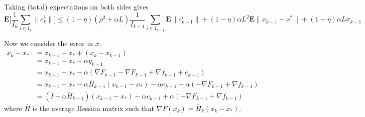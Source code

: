 \documentclass{article}
\begin{document}
 Taking (total) expectations on both sides gives
 \[
\mathbf{E}[ \frac{1}{I_k} \sum_{i\in I_k}{\|e_k^i\|] } \leq (1-\eta)(\rho^2+\alpha  L) \frac{1}{I_{k-1}}\sum_{i\in I_{k-1}}\mathbf{E}\|e_{k-1}^i\| + (1-\eta) \alpha  L^2 \mathbf{E}\|  x_{k-1}  -x^*  \|  + (1-\eta) \alpha  L\sigma_{k-1}
 \]
 
 

\bigskip

\bigskip

\noindent 

Now we consider the error in $x$.
 \begin{align*}
  x_k-x_\ast &= x_{k-1}-x_\ast + (x_k-x_{k-1})\\
  &=x_{k-1}-x_\ast -\alpha y_{k-1}\\
  &=x_{k-1}-x_\ast -\alpha (\nabla F_{k-1}-\nabla F_{k-1}+\nabla f_{k-1} + e_{k-1})\\
  &=x_{k-1}-x_\ast -\alpha\bar H_{k-1}(x_{k-1}-x_\ast) -\alpha e_{k-1} +\alpha (-\nabla F_{k-1}+\nabla f_{k-1})\\
  &=(I-\alpha\bar H_{k-1})(x_{k-1}-x_\ast) -\alpha e_{k-1} +\alpha (-\nabla F_{k-1}+\nabla f_{k-1}) 
 \end{align*}
 where $\bar{H}$ is the average Hessian matrix such that  $\nabla F(x_k) = \bar H_k(x_k-x_\ast)$.
\end{document}
